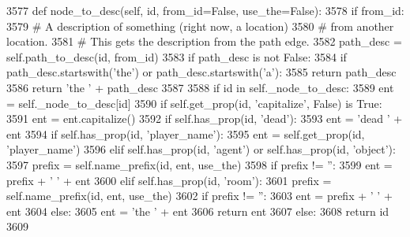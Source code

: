 \begin{DoxyCode}
3577     \textcolor{keyword}{def }node\_to\_desc(self, id, from\_id=False, use\_the=False):
3578         \textcolor{keywordflow}{if} from\_id:
3579             \textcolor{comment}{# A description of something (right now, a location)}
3580             \textcolor{comment}{# from another location.}
3581             \textcolor{comment}{# This gets the description from the path edge.}
3582             path\_desc = self.path\_to\_desc(id, from\_id)
3583             \textcolor{keywordflow}{if} path\_desc \textcolor{keywordflow}{is} \textcolor{keywordflow}{not} \textcolor{keyword}{False}:
3584                 \textcolor{keywordflow}{if} path\_desc.startswith(\textcolor{stringliteral}{'the'}) \textcolor{keywordflow}{or} path\_desc.startswith(\textcolor{stringliteral}{'a'}):
3585                     \textcolor{keywordflow}{return} path\_desc
3586                 \textcolor{keywordflow}{return} \textcolor{stringliteral}{'the '} + path\_desc
3587 
3588         \textcolor{keywordflow}{if} id \textcolor{keywordflow}{in} self.\_node\_to\_desc:
3589             ent = self.\_node\_to\_desc[id]
3590             \textcolor{keywordflow}{if} self.get\_prop(id, \textcolor{stringliteral}{'capitalize'}, \textcolor{keyword}{False}) \textcolor{keywordflow}{is} \textcolor{keyword}{True}:
3591                 ent = ent.capitalize()
3592             \textcolor{keywordflow}{if} self.has\_prop(id, \textcolor{stringliteral}{'dead'}):
3593                 ent = \textcolor{stringliteral}{'dead '} + ent
3594             \textcolor{keywordflow}{if} self.has\_prop(id, \textcolor{stringliteral}{'player\_name'}):
3595                 ent = self.get\_prop(id, \textcolor{stringliteral}{'player\_name'})
3596             \textcolor{keywordflow}{elif} self.has\_prop(id, \textcolor{stringliteral}{'agent'}) \textcolor{keywordflow}{or} self.has\_prop(id, \textcolor{stringliteral}{'object'}):
3597                 prefix = self.name\_prefix(id, ent, use\_the)
3598                 \textcolor{keywordflow}{if} prefix != \textcolor{stringliteral}{''}:
3599                     ent = prefix + \textcolor{stringliteral}{' '} + ent
3600             \textcolor{keywordflow}{elif} self.has\_prop(id, \textcolor{stringliteral}{'room'}):
3601                 prefix = self.name\_prefix(id, ent, use\_the)
3602                 \textcolor{keywordflow}{if} prefix != \textcolor{stringliteral}{''}:
3603                     ent = prefix + \textcolor{stringliteral}{' '} + ent
3604                 \textcolor{keywordflow}{else}:
3605                     ent = \textcolor{stringliteral}{'the '} + ent
3606             \textcolor{keywordflow}{return} ent
3607         \textcolor{keywordflow}{else}:
3608             \textcolor{keywordflow}{return} id
3609 
\end{DoxyCode}
\mbox{\label{classlight__chats_1_1graph_1_1Graph_ae0b96f3393dd176f10c3f154649cdf25}} 

